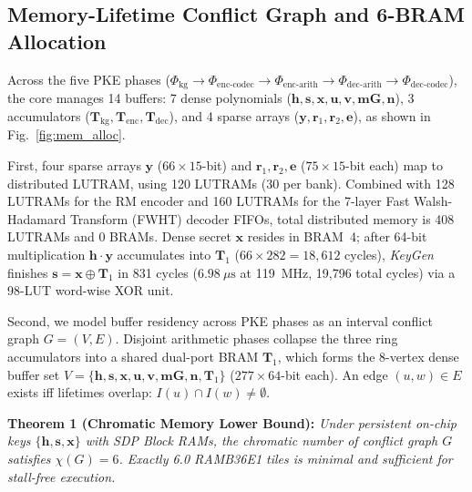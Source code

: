 \documentclass[journal]{IEEEtran}
\begin{document}
\subsection{Memory-Lifetime Conflict Graph and 6-BRAM Allocation}
Across the five PKE phases ($\Phi_{\text{kg}} \rightarrow \Phi_{\text{enc-codec}} \rightarrow \Phi_{\text{enc-arith}} \rightarrow \Phi_{\text{dec-arith}} \rightarrow \Phi_{\text{dec-codec}}$), the core manages 14 buffers: 7 dense polynomials ($\mathbf{h}, \mathbf{s}, \mathbf{x}, \mathbf{u}, \mathbf{v}, \mathbf{mG}, \mathbf{n}$), 3 accumulators ($\mathbf{T}_{\text{kg}}, \mathbf{T}_{\text{enc}}, \mathbf{T}_{\text{dec}}$), and 4 sparse arrays ($\mathbf{y}, \mathbf{r}_1, \mathbf{r}_2, \mathbf{e}$), as shown in Fig.~\ref{fig:mem_alloc}.

First, four sparse arrays $\mathbf{y}$ ($66 \times 15$-bit) and $\mathbf{r}_1, \mathbf{r}_2, \mathbf{e}$ ($75 \times 15$-bit each) map to distributed LUTRAM, using 120 LUTRAMs (30 per bank). Combined with 128 LUTRAMs for the RM encoder and 160 LUTRAMs for the 7-layer Fast Walsh-Hadamard Transform (FWHT) decoder FIFOs, total distributed memory is 408 LUTRAMs and 0 BRAMs. Dense secret $\mathbf{x}$ resides in BRAM~4; after 64-bit multiplication $\mathbf{h} \cdot \mathbf{y}$ accumulates into $\mathbf{T}_1$ ($66 \times 282 = 18,612$ cycles), \textit{KeyGen} finishes $\mathbf{s} = \mathbf{x} \oplus \mathbf{T}_1$ in 831 cycles ($6.98\ \mu\text{s}$ at 119~MHz, 19,796 total cycles) via a 98-LUT word-wise XOR unit.

Second, we model buffer residency across PKE phases as an interval conflict graph $G = (V, E)$. Disjoint arithmetic phases collapse the three ring accumulators into a shared dual-port BRAM $\mathbf{T}_1$, which forms the 8-vertex dense buffer set $V = \{\mathbf{h}, \mathbf{s}, \mathbf{x}, \mathbf{u}, \mathbf{v}, \mathbf{mG}, \mathbf{n}, \mathbf{T}_1\}$ ($277 \times 64$-bit each). An edge $(u, w) \in E$ exists iff lifetimes overlap: $I(u) \cap I(w) \ne \emptyset$.

\textbf{Theorem 1 (Chromatic Memory Lower Bound):} \textit{Under persistent on-chip keys $\{\mathbf{h}, \mathbf{s}, \mathbf{x}\}$ with SDP Block RAMs, the chromatic number of conflict graph $G$ satisfies $\chi(G) = 6$. Exactly 6.0 RAMB36E1 tiles is minimal and sufficient for stall-free execution.}
\end{document}
